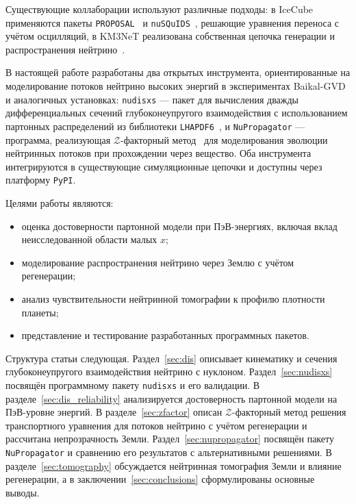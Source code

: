 Существующие коллаборации используют различные подходы: в IceCube применяются пакеты \texttt{PROPOSAL}~\cite{Koehne:2013gpa} и \texttt{nuSQuIDS}~\cite{ARGUELLES2022108346}, решающие уравнения переноса с учётом осцилляций, в KM3NeT реализована собственная цепочка генерации и распространения нейтрино~\cite{ARGUELLES2022108346}.  

В настоящей работе разработаны два открытых инструмента, ориентированные на моделирование потоков нейтрино высоких энергий в экспериментах Baikal-GVD и аналогичных установках:  
\texttt{nudisxs} — пакет для вычисления дважды дифференциальных сечений глубоконеупругого взаимодействия с использованием партонных распределений из библиотеки \texttt{LHAPDF6}~\cite{Buckley_2015},  
и \texttt{NuPropagator} — программа, реализующая $\mathcal{Z}$-факторный метод~\cite{Naumov:1998sf} для моделирования эволюции нейтринных потоков при прохождении через вещество.  
Оба инструмента интегрируются в существующие симуляционные цепочки и доступны через платформу \texttt{PyPI}.  

Целями работы являются:
\begin{itemize}
    \item оценка достоверности партонной модели при ПэВ-энергиях, включая вклад неисследованной области малых $x$;
    \item моделирование распространения нейтрино через Землю с учётом регенерации;
    \item анализ чувствительности нейтринной томографии к профилю плотности планеты;
    \item представление и тестирование разработанных программных пакетов.
\end{itemize}

Структура статьи следующая.  
Раздел~\ref{sec:dis} описывает кинематику и сечения глубоконеупругого взаимодействия нейтрино с нуклоном.  
Раздел~\ref{sec:nudisxs} посвящён программному пакету \texttt{nudisxs} и его валидации.  
В разделе~\ref{sec:dis_reliability} анализируется достоверность партонной модели на ПэВ-уровне энергий.  
В разделе~\ref{sec:zfactor} описан $\mathcal{Z}$-факторный метод решения транспортного уравнения для потоков нейтрино с учётом регенерации и рассчитана непрозрачность Земли.  
Раздел~\ref{sec:nupropagator} посвящён пакету \texttt{NuPropagator} и сравнению его результатов с альтернативными решениями.  
В разделе~\ref{sec:tomography} обсуждается нейтринная томография Земли и влияние регенерации, а в заключении~\ref{sec:conclusions} сформулированы основные выводы.
